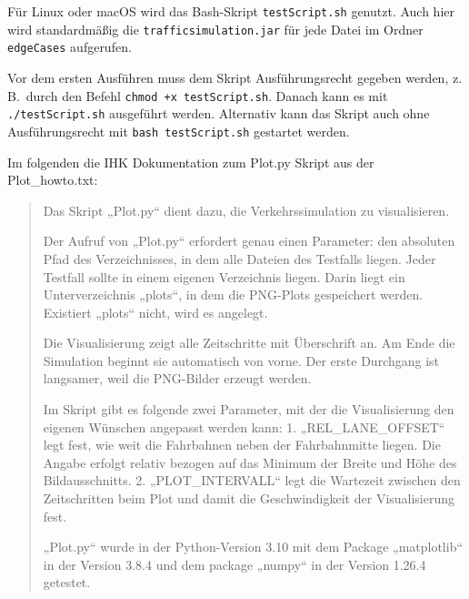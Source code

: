 Für Linux oder macOS wird das Bash-Skript \texttt{testScript.sh} genutzt. Auch hier wird standardmäßig die \texttt{trafficsimulation.jar} für jede Datei im Ordner \texttt{edgeCases} aufgerufen.

Vor dem ersten Ausführen muss dem Skript Ausführungsrecht gegeben werden, z.\,B.\ durch den Befehl \texttt{chmod +x testScript.sh}. Danach kann es mit \texttt{./testScript.sh} ausgeführt werden.
Alternativ kann das Skript auch ohne Ausführungsrecht mit \texttt{bash testScript.sh} gestartet werden.

Im folgenden die IHK Dokumentation zum Plot.py Skript aus der Plot\_howto.txt:

\begin{quote}
Das Skript „Plot.py“ dient dazu, die Verkehrssimulation zu visualisieren. 

Der Aufruf von „Plot.py“ erfordert genau einen Parameter: den absoluten Pfad des Verzeichnisses,
in dem alle Dateien des Testfalls liegen.
Jeder Testfall sollte in einem eigenen Verzeichnis liegen.
Darin liegt ein Unterverzeichnis „plots“, in dem die PNG-Plots gespeichert werden. Existiert „plots“ nicht, wird es angelegt.

Die Visualisierung zeigt alle Zeitschritte mit Überschrift an.
Am Ende die Simulation beginnt sie automatisch von vorne. Der erste Durchgang ist langsamer, weil die PNG-Bilder erzeugt werden. 

Im Skript gibt es folgende zwei Parameter, mit der die Visualisierung den eigenen Wünschen angepasst werden kann:
1. „REL\_LANE\_OFFSET“ legt fest, wie weit die Fahrbahnen neben der Fahrbahnmitte liegen.
Die Angabe erfolgt relativ bezogen auf das Minimum der Breite und Höhe des Bildausschnitts. 
2. „PLOT\_INTERVALL“ legt die Wartezeit zwischen den Zeitschritten beim Plot und damit die Geschwindigkeit der Visualisierung fest.

„Plot.py“ wurde in der Python-Version 3.10 mit dem Package „matplotlib“ in der Version 3.8.4 und dem package „numpy“ in der Version 1.26.4 getestet.
\end{quote}

